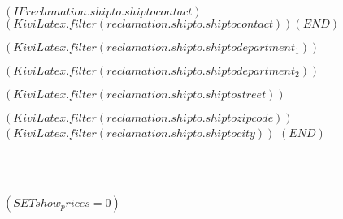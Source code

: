                  $( IF reclamation.shipto.shiptocontact )$ $( KiviLatex.filter(reclamation.shipto.shiptocontact) )$$( END )$

                 $( KiviLatex.filter(reclamation.shipto.shiptodepartment_1) )$

                 $( KiviLatex.filter(reclamation.shipto.shiptodepartment_2) )$

                 $( KiviLatex.filter(reclamation.shipto.shiptostreet) )$

                 $( KiviLatex.filter(reclamation.shipto.shiptozipcode) )$ $( KiviLatex.filter(reclamation.shipto.shiptocity) )$
$( END )$
\vspace*{1.5cm}

\hfill

\\

\vkreklamationsformel\\

\vspace{0.5cm}

$( SET show_prices = 0 )$

